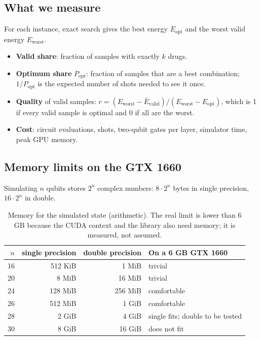 \subsection{What we measure}

For each instance, exact search gives the best energy $E_{\text{opt}}$ and the worst valid energy $E_{\text{worst}}$.
\begin{itemize}
\item \textbf{Valid share}: fraction of samples with exactly $k$ drugs.
\item \textbf{Optimum share} $P_{\text{opt}}$: fraction of samples that are a best combination; $1/P_{\text{opt}}$ is the expected number of shots needed to see it once.
\item \textbf{Quality} of valid samples: $r=(E_{\text{worst}}-\bar E_{\text{valid}})/(E_{\text{worst}}-E_{\text{opt}})$, which is 1 if every valid sample is optimal and 0 if all are the worst.
\item \textbf{Cost}: circuit evaluations, shots, two-qubit gates per layer, simulator time, peak GPU memory.
\end{itemize}

\subsection{Memory limits on the GTX 1660}

Simulating $n$ qubits stores $2^n$ complex numbers: $8\cdot 2^n$ bytes in single precision, $16\cdot2^n$ in double.

\begin{table}[ht]
\centering
\small
\begin{tabular}{rrrl}
\toprule
$n$ & single precision & double precision & On a 6 GB GTX 1660 \\
\midrule
16 & 512 KiB & 1 MiB & trivial \\
20 & 8 MiB & 16 MiB & trivial \\
24 & 128 MiB & 256 MiB & comfortable \\
26 & 512 MiB & 1 GiB & comfortable \\
28 & 2 GiB & 4 GiB & single fits; double to be tested \\
30 & 8 GiB & 16 GiB & does not fit \\
\bottomrule
\end{tabular}
\caption{Memory for the simulated state (arithmetic). The real limit is lower than 6 GB because the CUDA context and the library also need memory; it is measured, not assumed.}
\label{tab:svmem}
\end{table}

